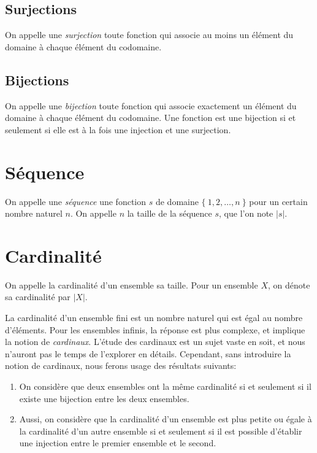 \subsection{Surjections}

On appelle une \og \textit{surjection} \fg{} toute fonction qui associe au moins un élément du domaine à chaque élément du codomaine.

\subsection{Bijections}

On appelle une \og \textit{bijection} \fg{} toute fonction qui associe exactement un élément du domaine à chaque élément du codomaine.
Une fonction est une bijection si et seulement si elle est à la fois une injection et une surjection.

\section{Séquence}

On appelle une \og \textit{séquence} \fg{} une fonction $s$ de domaine $\{\ 1, 2, \dots, n\ \}$ pour un certain nombre naturel $n$.
On appelle $n$ la taille de la séquence $s$, que l'on note $|s|$.

\section{Cardinalité}

On appelle la cardinalité d'un ensemble sa taille. Pour un ensemble $X$, on dénote sa cardinalité par $|X|$.

La cardinalité d'un ensemble fini est un nombre naturel qui est égal au nombre d'éléments.
Pour les ensembles infinis, la réponse est plus complexe, et implique la notion de \textit{cardinaux}.
L'étude des cardinaux est un sujet vaste en soit, et nous n'auront pas le temps de l'explorer en détails.
Cependant, sans introduire la notion de cardinaux, nous ferons usage des résultats suivants:
\begin{enumerate}
\item
On considère que deux ensembles ont la même cardinalité si et seulement si il existe une bijection entre les deux ensembles.
\item
Aussi, on considère que la cardinalité d'un ensemble est plus petite ou égale à la cardinalité d'un autre ensemble si et seulement si il est possible d'établir une injection entre le premier ensemble et le second.
\end{enumerate}

